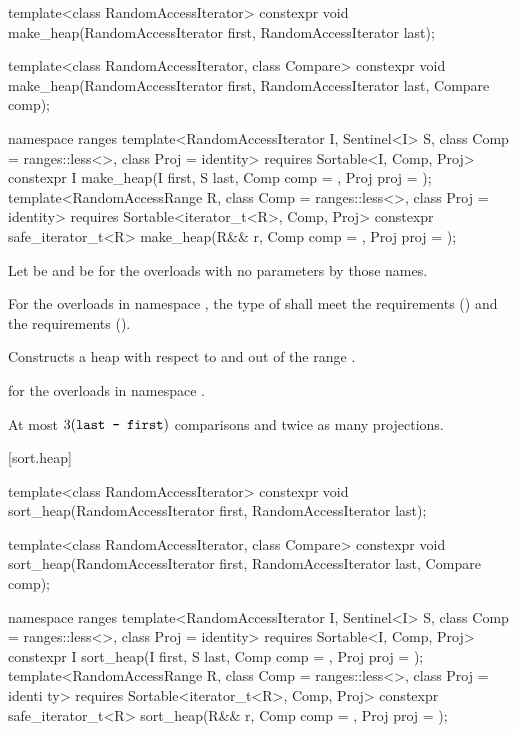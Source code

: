 %
\begin{itemdecl}
template<class RandomAccessIterator>
  constexpr void make_heap(RandomAccessIterator first, RandomAccessIterator last);

template<class RandomAccessIterator, class Compare>
  constexpr void make_heap(RandomAccessIterator first, RandomAccessIterator last,
                           Compare comp);

namespace ranges {
  template<RandomAccessIterator I, Sentinel<I> S, class Comp = ranges::less<>,
      class Proj = identity>
    requires Sortable<I, Comp, Proj>
    constexpr I
      make_heap(I first, S last, Comp comp = {}, Proj proj = {});
  template<RandomAccessRange R, class Comp = ranges::less<>, class Proj = identity>
    requires Sortable<iterator_t<R>, Comp, Proj>
    constexpr safe_iterator_t<R>
      make_heap(R&& r, Comp comp = {}, Proj proj = {});
}
\end{itemdecl}

\begin{itemdescr}
\pnum
Let  be 
and  be 
for the overloads with no parameters by those names.

\pnum
\requires
For the overloads in namespace ,
the type of  shall meet
the  requirements
() and the
 requirements
().

\pnum
\effects
Constructs a heap with respect to  and  out of the range
.

\pnum
\returns
{} for the overloads in namespace .

\pnum
\complexity
At most
$3(\texttt{last - first})$
comparisons and twice as many projections.
\end{itemdescr}

[sort.heap]{}

%
\begin{itemdecl}
template<class RandomAccessIterator>
  constexpr void sort_heap(RandomAccessIterator first, RandomAccessIterator last);

template<class RandomAccessIterator, class Compare>
  constexpr void sort_heap(RandomAccessIterator first, RandomAccessIterator last,
                           Compare comp);

namespace ranges {
  template<RandomAccessIterator I, Sentinel<I> S, class Comp = ranges::less<>,
      class Proj = identity>
    requires Sortable<I, Comp, Proj>
    constexpr I
      sort_heap(I first, S last, Comp comp = {}, Proj proj = {});
  template<RandomAccessRange R, class Comp = ranges::less<>, class Proj = identi
ty>
    requires Sortable<iterator_t<R>, Comp, Proj>
    constexpr safe_iterator_t<R>
      sort_heap(R&& r, Comp comp = {}, Proj proj = {});
}
\end{itemdecl}

